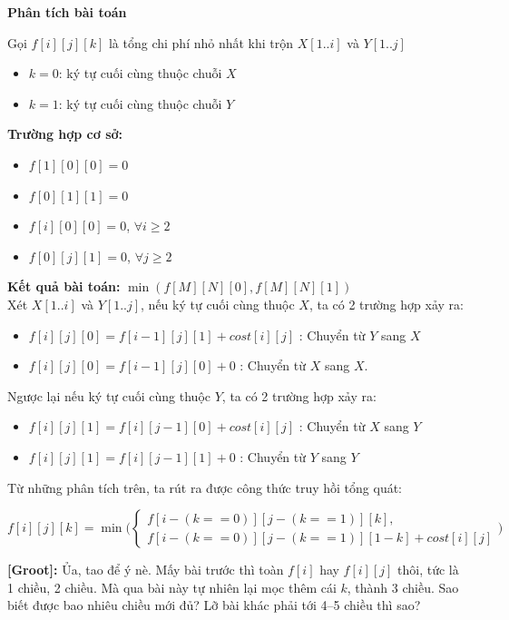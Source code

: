 \textbf{Phân tích bài toán}

Gọi $f[i][j][k]$ là tổng chi phí nhỏ nhất khi trộn $X[1..i]$ và $Y[1..j]$
\begin{itemize}
    \item $k = 0$: ký tự cuối cùng thuộc chuỗi $X$
    \item $k = 1$: ký tự cuối cùng thuộc chuỗi $Y$
\end{itemize} 

\textbf{Trường hợp cơ sở:}
\begin{itemize}
    \item $f[1][0][0] = 0$
    \item $f[0][1][1] = 0$
    \item $f[i][0][0] = 0$, $\forall i \geq 2$
    \item $f[0][j][1] = 0$, $\forall j \geq 2$
\end{itemize}

\textbf{Kết quả bài toán:} $\min(f[M][N][0], f[M][N][1])$\\

Xét $X[1..i]$ và $Y[1..j]$, nếu ký tự cuối cùng thuộc $X$, ta có 2 trường hợp xảy ra:

\begin{itemize}
    \item $f[i][j][0] = f[i - 1][j][1] + cost[i][j]$ : Chuyển từ $Y$ sang $X$ 
    \item $f[i][j][0] = f[i - 1][j][0] + 0$ : Chuyển từ $X$ sang $X$.
\end{itemize}
    
Ngược lại nếu ký tự cuối cùng thuộc $Y$, ta có 2 trường hợp xảy ra:
\begin{itemize}
    \item $f[i][j][1] = f[i][j - 1][0] + cost[i][j]$ : Chuyển từ $X$ sang $Y$
    \item $f[i][j][1] = f[i][j - 1][1] + 0$ : Chuyển từ $Y$ sang $Y$
\end{itemize}

Từ những phân tích trên, ta rút ra được công thức truy hồi tổng quát:


\[
f[i][j][k] = \min \Big( 
    \begin{cases}
        f[i - (k == 0)][j - (k == 1)][k], \\
        f[i - (k == 0)][j - (k == 1)][1 - k] + cost[i][j]
    \end{cases}
    \Big)
\]

\textbf{[Groot]:} Ủa, tao để ý nè. Mấy bài trước thì toàn $f[i]$ hay $f[i][j]$ thôi, 
tức là 1 chiều, 2 chiều. Mà qua bài này tự nhiên lại mọc thêm cái $k$, 
thành 3 chiều. Sao biết được bao nhiêu chiều mới đủ? 
Lỡ bài khác phải tới 4–5 chiều thì sao?\\


